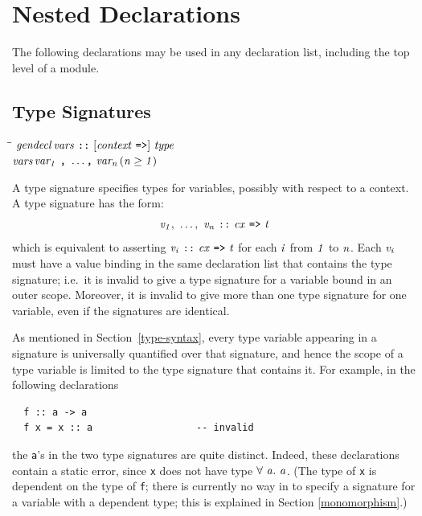 \section{Nested Declarations}
\label{nested}

The following declarations may be used in any declaration list,
including the top level of a module.

\subsection{Type Signatures}
\label{type-signatures}

\begin{flushleft}\it\begin{tabbing}
\hspace{0.6in}\=\hspace{3.1in}\=\kill
$\it gendecl$\>\makebox[3.5em]{$\rightarrow$}$\it vars\ \makebox{\tt ::}\ [context\ \makebox{\tt =>}]\ type$\\ 
$\it vars$\>\makebox[3.5em]{$\rightarrow$}$\it var_1\ \makebox{\tt ,}\ \ldots \makebox{\tt ,}\ var_n$\>\makebox[3em]{}$\it (n\geq 1)$
\end{tabbing}\end{flushleft}
%
%
A type signature specifies types for variables, possibly with respect
to a context.  A type signature has the form:
\[
\mbox{$\it v_1,\ \ldots ,\ v_n\ \makebox{\tt ::}\ cx\ \makebox{\tt =>}\ t$}
\]
which is equivalent to asserting
\mbox{$\it v_i\ \makebox{\tt ::}\ cx\ \makebox{\tt =>}\ t$}
for each \mbox{$\it i$} from \mbox{$\it 1$} to \mbox{$\it n$}.  Each \mbox{$\it v_i$} must have a value binding in
the same declaration list that contains the type signature; i.e.~it is
invalid to give a type signature for a variable bound in an
outer scope.
Moreover, it is invalid to give more than one type signature for one
variable, even if the signatures are identical.

As mentioned in Section~\ref{type-syntax},
every type variable appearing in a signature
is universally quantified over that signature, and hence
the scope of a type variable is limited to the type
signature that contains it.  For example, in the following
declarations
\bprog
{\small\begin{verbatim}
  f :: a -> a
  f x = x :: a                  -- invalid
\end{verbatim}}
\eprog
the \mbox{\tt a}'s in the two type signatures are quite distinct.  Indeed,
these declarations contain a static error, since \mbox{\tt x} does not have
type \mbox{$\it \forall\ a.~a$}.  (The type of \mbox{\tt x} is dependent on the type of
\mbox{\tt f}; there is currently no way in \Haskell{} to specify a signature
for a variable with a dependent type; this is explained in Section
\ref{monomorphism}.)

